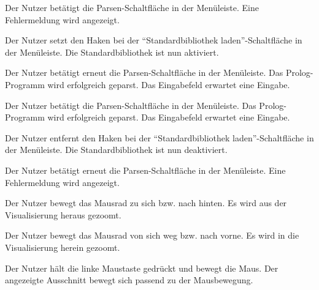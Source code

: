 \documentclass[parskip=full,11pt,twoside]{scrartcl}
\begin{document}

{Der Nutzer betätigt die Parsen-Schaltfläche in der Menüleiste.}
{Eine Fehlermeldung wird angezeigt.}

{Der Nutzer setzt den Haken bei der \enquote{Standardbibliothek laden}-Schaltfläche in der Menüleiste.}
{Die Standardbibliothek ist nun aktiviert.}

{Der Nutzer betätigt erneut die Parsen-Schaltfläche in der Menüleiste.}
{Das Prolog-Programm wird erfolgreich geparst. Das Eingabefeld erwartet eine Eingabe.}


{Der Nutzer betätigt die Parsen-Schaltfläche in der Menüleiste.}
{Das Prolog-Programm wird erfolgreich geparst. Das Eingabefeld erwartet eine Eingabe.}

{Der Nutzer entfernt den Haken bei der \enquote{Standardbibliothek laden}-Schaltfläche in der Menüleiste.}
{Die Standardbibliothek ist nun deaktiviert.}

{Der Nutzer betätigt erneut die Parsen-Schaltfläche in der Menüleiste.}
{Eine Fehlermeldung wird angezeigt.}


{Der Nutzer bewegt das Mausrad zu sich bzw. nach hinten.}
{Es wird aus der Visualisierung heraus gezoomt.}

{Der Nutzer bewegt das Mausrad von sich weg bzw. nach vorne.}
{Es wird in die Visualisierung herein gezoomt.}


{Der Nutzer hält die linke Maustaste gedrückt und bewegt die Maus.}
{Der angezeigte Ausschnitt bewegt sich passend zu der Mausbewegung.}
\end{document}
